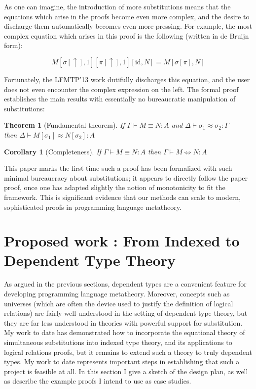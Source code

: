 \documentclass{article}
\newtheorem{theorem}{Theorem}
\newtheorem{corollary}{Corollary}
\begin{document}
As one can imagine, the introduction of more substitutions means that
the equations which arise in the proofs become even more complex, and
the desire to discharge them automatically becomes even more
pressing. For example, the most complex equation which arises in this
proof is the following (written in de Bruijn form):

$$
M[\sigma[\uparrow],1][\pi[\uparrow],1][\text{id}, N] = M[\sigma[\pi],N]
$$

Fortunately, the LFMTP'13 work dutifully discharges this equation, and the user
does not even encounter the complex expression on the left. The formal
proof establishes the main results with essentially no bureaucratic
manipulation of substitutions:

\begin{theorem}[Fundamental theorem]
If $\Gamma \vdash M \equiv N : A$ and $\Delta \vdash \sigma_1 \approx
\sigma_2 : \Gamma$ \\ then $\Delta \vdash M[\sigma_1] \approx
N[\sigma_2] : A$
\end{theorem}

\begin{corollary}[Completeness]
If $\Gamma \vdash M \equiv N : A$ then $\Gamma \vdash M
\Leftrightarrow N : A$
\end{corollary}

This paper marks the first time such a proof has been formalized with
such minimal bureaucracy about substitutions; it appears to directly
follow the paper proof, once one has adapted slightly the notion of
monotonicity to fit the framework. This is significant evidence that
our methods can scale to modern, sophisticated proofs in programming
language metatheory.

\section{Proposed work : From Indexed to Dependent Type Theory}\label{sec:proposed}
As argued in the previous sections, dependent types are a convenient
feature for developing programming language metatheory. Moreover,
concepts such as universes (which are often the device used to justify
the definition of logical relations) are fairly well-understood in the setting of
dependent type theory, but they are far less understood in
theories with powerful support for substitution. My work to date
has demonstrated how to incorporate the equational theory of
simultaneous substitutions into indexed type theory, and its
applications to logical relations proofs, but it remains to extend
such a theory to truly dependent types. My work to date represents
important steps in establishing that such a project is feasible at
all. In this section I give a sketch of the design plan, as well as
describe the example proofs I intend to use as case studies.
\end{document}
